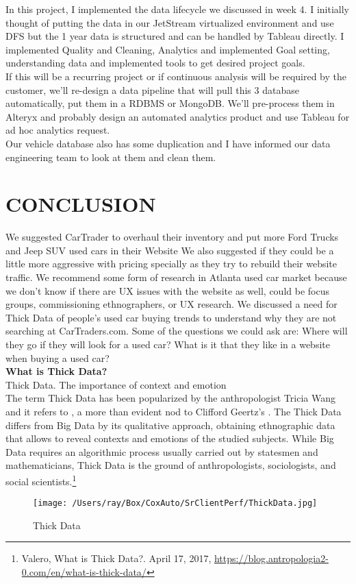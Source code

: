\documentclass[
	12pt, %
	letterpaper, %
]{tPlate}
\begin{document}
In this project, I implemented the data lifecycle we discussed in week 4.  I initially thought of putting the data in our JetStream virtualized environment and use DFS but the 1 year data is structured and can be handled by Tableau directly.  I implemented Quality and Cleaning, Analytics and implemented Goal setting, understanding data and implemented tools to get desired project goals.\\

If this will be a recurring project or if continuous analysis will be required by the customer, we'll re-design a data pipeline that will pull this 3 database automatically, put them in a RDBMS or MongoDB.  We'll pre-process them in Alteryx and probably design an automated analytics product and use Tableau for ad hoc analytics request.\\

Our vehicle database also has some duplication and I have informed our data engineering team to look at them and clean them.

\section{CONCLUSION}
We suggested CarTrader to overhaul their inventory and put more Ford Trucks and Jeep SUV used cars in their Website  We also suggested if they could be a little more aggressive with pricing specially as they try to rebuild their website traffic.  We recommend some form of research in Atlanta used car market because we don't know if there are UX issues with the website as well, could be focus groups, commissioning ethnographers, or UX research. We discussed a need for Thick Data of people's used car buying trends to understand why they are not searching at CarTraders.com.  Some of the questions we could ask are: Where will they go if they will look for a used car? What is it that they like in a website when buying a used car?\\[5mm]

\textbf{What is Thick Data?}\\

Thick Data. The importance of context and emotion\\

The term Thick Data has been popularized by the anthropologist Tricia Wang and it 
refers to , a more than evident nod to Clifford Geertz's . 
The Thick Data differs from Big Data by its qualitative approach, obtaining ethnographic data that 
allows to reveal contexts and emotions of the studied subjects. While Big Data requires an algorithmic 
process usually carried out by statesmen and mathematicians, Thick Data is the ground of anthropologists, 
sociologists, and social scientists.\footnote {Valero, What is Thick Data?. April 17, 2017,
 \url{https://blog.antropologia2-0.com/en/what-is-thick-data/}}



\begin{figure}[H]
	\centering
	\texttt{[image: /Users/ray/Box/CoxAuto/SrClientPerf/ThickData.jpg]}
	\caption{Thick Data}
	\label{fig. 7}
\end{figure}
\end{document}
